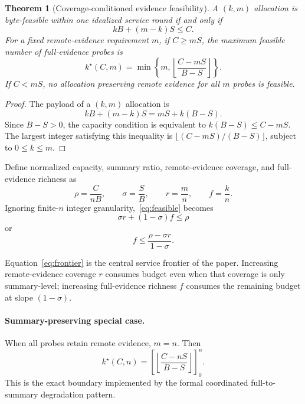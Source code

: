 \documentclass[10pt,journal]{IEEEtran}
\newtheorem{theorem}{Theorem}
\begin{document}
\begin{theorem}[Coverage-conditioned evidence feasibility]
\label{thm:frontier}
A $(k,m)$ allocation is byte-feasible within one idealized service round
if and only if
\begin{equation}
kB+(m-k)S\leq C .
\label{eq:feasible}
\end{equation}
For a fixed remote-evidence requirement $m$, if $C\geq mS$, the maximum
feasible number of full-evidence probes is
\begin{equation}
k^\star(C,m)
=
\min\left\{
m,
\left\lfloor
\frac{C-mS}{B-S}
\right\rfloor
\right\}.
\label{eq:kstar}
\end{equation}
If $C<mS$, no allocation preserving remote evidence for all $m$ probes
is feasible.
\end{theorem}

\begin{proof}
The payload of a $(k,m)$ allocation is
\[
kB+(m-k)S=mS+k(B-S).
\]
Since $B-S>0$, the capacity condition is equivalent to
$k(B-S)\leq C-mS$. The largest integer satisfying this inequality is
$\lfloor(C-mS)/(B-S)\rfloor$, subject to $0\leq k\leq m$.
\end{proof}

Define normalized capacity, summary ratio, remote-evidence coverage, and
full-evidence richness as
\begin{equation}
\rho=\frac{C}{nB},
\qquad
\sigma=\frac{S}{B},
\qquad
r=\frac{m}{n},
\qquad
f=\frac{k}{n}.
\end{equation}
Ignoring finite-$n$ integer granularity,~\eqref{eq:feasible} becomes
\begin{equation}
\boxed{
\sigma r+(1-\sigma)f\leq\rho
}
\label{eq:frontier}
\end{equation}
or
\begin{equation}
f\leq\frac{\rho-\sigma r}{1-\sigma}.
\label{eq:frontier2}
\end{equation}

Equation~\eqref{eq:frontier} is the central service frontier of the
paper. Increasing remote-evidence coverage $r$ consumes budget even when
that coverage is only summary-level; increasing full-evidence richness
$f$ consumes the remaining budget at slope $(1-\sigma)$.

\paragraph{Summary-preserving special case.}
When all probes retain remote evidence, $m=n$. Then
\begin{equation}
k^\star(C,n)
=
\left[
\left\lfloor
\frac{C-nS}{B-S}
\right\rfloor
\right]_0^n .
\label{eq:summarypreserving}
\end{equation}
This is the exact boundary implemented by the formal coordinated
full-to-summary degradation pattern.
\end{document}
